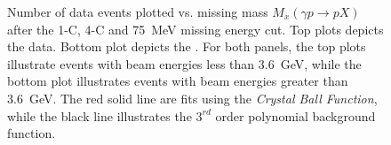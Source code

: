 \begin{figure}[h!]\begin{center}

\caption[Number of data events plotted vs. missing mass $M_x(\gamma p \to p X)$ after the 1-C, 4-C and 75~MeV missing energy cut]{\label{kinefit.mm2p.data.MC}Number of data events plotted vs. missing mass $M_x(\gamma p \to p X)$ after the 1-C, 4-C and 75~MeV missing energy cut. Top plots depicts the data. Bottom plot depicts the . For both panels, the top plots illustrate events with beam energies less than 3.6~GeV, while the bottom plot illustrates events with beam energies greater than 3.6~GeV. The red solid line are fits using the \emph{Crystal Ball Function}, while the black line illustrates the $3^{rd}$ order polynomial background function. }

\end{center}\end{figure}
\FloatBarrier

